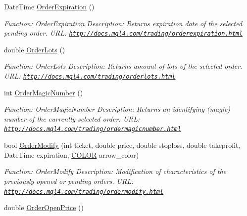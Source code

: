 \begin{DoxyCompactItemize}
Date\+Time \hyperlink{class_m_q_l4_c_sharp_1_1_base_1_1_m_q_l_base_ab1b152b82465693927f733966b0d7196}{Order\+Expiration} ()
\begin{DoxyCompactList}\small\item\em Function\+: Order\+Expiration Description\+: Returns expiration date of the selected pending order. U\+RL\+: \href{http://docs.mql4.com/trading/orderexpiration.html}{\tt http\+://docs.\+mql4.\+com/trading/orderexpiration.\+html} \end{DoxyCompactList}\item 
double \hyperlink{class_m_q_l4_c_sharp_1_1_base_1_1_m_q_l_base_a3f96574164d2f173cb589435a7d9cfb5}{Order\+Lots} ()
\begin{DoxyCompactList}\small\item\em Function\+: Order\+Lots Description\+: Returns amount of lots of the selected order. U\+RL\+: \href{http://docs.mql4.com/trading/orderlots.html}{\tt http\+://docs.\+mql4.\+com/trading/orderlots.\+html} \end{DoxyCompactList}\item 
int \hyperlink{class_m_q_l4_c_sharp_1_1_base_1_1_m_q_l_base_a0bea6d26dd01fb6da8565eb9b64e5b73}{Order\+Magic\+Number} ()
\begin{DoxyCompactList}\small\item\em Function\+: Order\+Magic\+Number Description\+: Returns an identifying (magic) number of the currently selected order. U\+RL\+: \href{http://docs.mql4.com/trading/ordermagicnumber.html}{\tt http\+://docs.\+mql4.\+com/trading/ordermagicnumber.\+html} \end{DoxyCompactList}\item 
bool \hyperlink{class_m_q_l4_c_sharp_1_1_base_1_1_m_q_l_base_af21d9000ce63849dbfcc118ba1fcb46b}{Order\+Modify} (int ticket, double price, double stoploss, double takeprofit, Date\+Time expiration, \hyperlink{namespace_m_q_l4_c_sharp_1_1_base_1_1_enums_a79b99235c71c70f2f5207aac2ff24f1a}{C\+O\+L\+OR} arrow\+\_\+color)
\begin{DoxyCompactList}\small\item\em Function\+: Order\+Modify Description\+: Modification of characteristics of the previously opened or pending orders. U\+RL\+: \href{http://docs.mql4.com/trading/ordermodify.html}{\tt http\+://docs.\+mql4.\+com/trading/ordermodify.\+html} \end{DoxyCompactList}\item 
double \hyperlink{class_m_q_l4_c_sharp_1_1_base_1_1_m_q_l_base_ac6fd95e646930f6bc0cca5bf3b1cb634}{Order\+Open\+Price} ()

\end{DoxyCompactItemize}
